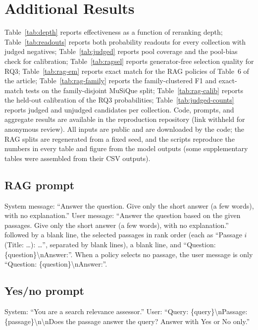 \section{Additional Results}

Table~\ref{tab:depth} reports effectiveness as a function of reranking depth; Table~\ref{tab:readouts} reports both probability readouts for every collection with judged negatives; Table~\ref{tab:judged} reports pool coverage and the pool-bias check for calibration; Table~\ref{tab:ragsel} reports generator-free selection quality for RQ3; Table~\ref{tab:rag-em} reports exact match for the RAG policies of Table~6 of the article; Table~\ref{tab:rag-family} reports the family-clustered F1 and exact-match tests on the family-disjoint MuSiQue split; Table~\ref{tab:rag-calib} reports the held-out calibration of the RQ3 probabilities; Table~\ref{tab:judged-counts} reports judged and unjudged candidates per collection.
Code, prompts, and aggregate results are available in the reproduction repository (link withheld for anonymous review). All inputs are public and are downloaded by the code; the RAG splits are regenerated from a fixed seed, and the scripts reproduce the numbers in every table and figure from the model outputs (some supplementary tables were assembled from their CSV outputs).









\subsection{RAG prompt}
System message: ``Answer the question. Give only the short answer (a few words), with no explanation.'' User message: ``Answer the question based on the given passages. Give only the short answer (a few words), with no explanation.'' followed by a blank line, the selected passages in rank order (each as ``Passage $i$ (Title: \dots): \dots'', separated by blank lines), a blank line, and ``Question: \{question\}\textbackslash nAnswer:''. When a policy selects no passage, the user message is only ``Question: \{question\}\textbackslash nAnswer:''.

\subsection{Yes/no prompt}
System: ``You are a search relevance assessor.'' User: ``Query: \{query\}\textbackslash nPassage: \{passage\}\textbackslash n\textbackslash nDoes the passage answer the query? Answer with Yes or No only.''

